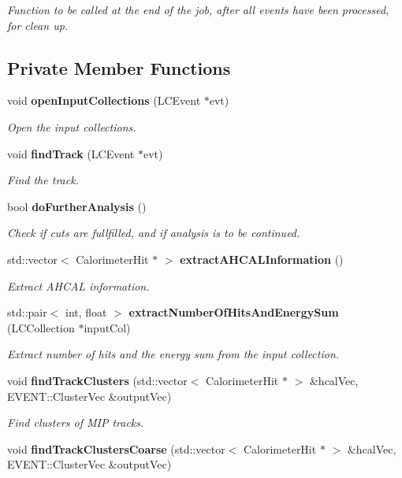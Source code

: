 \begin{DoxyCompactItemize}
\begin{DoxyCompactList}\small\item\em Function to be called at the end of the job, after all events have been processed, for clean up. \item\end{DoxyCompactList}\end{DoxyCompactItemize}
\subsection*{Private Member Functions}
\begin{DoxyCompactItemize}
\item 
void {\bf openInputCollections} (LCEvent $\ast$evt)
\begin{DoxyCompactList}\small\item\em Open the input collections. \item\end{DoxyCompactList}\item 
void {\bf findTrack} (LCEvent $\ast$evt)
\begin{DoxyCompactList}\small\item\em Find the track. \item\end{DoxyCompactList}\item 
bool {\bf doFurtherAnalysis} ()
\begin{DoxyCompactList}\small\item\em Check if cuts are fullfilled, and if analysis is to be continued. \item\end{DoxyCompactList}\item 
std::vector$<$ CalorimeterHit $\ast$ $>$ {\bf extractAHCALInformation} ()\label{classCALICE_1_1AngleTrackFinder_a86fc7e637d10c7ee1ab9851b1fc54e1b}

\begin{DoxyCompactList}\small\item\em Extract AHCAL information. \item\end{DoxyCompactList}\item 
std::pair$<$ int, float $>$ {\bf extractNumberOfHitsAndEnergySum} (LCCollection $\ast$inputCol)
\begin{DoxyCompactList}\small\item\em Extract number of hits and the energy sum from the input collection. \item\end{DoxyCompactList}\item 
void {\bf findTrackClusters} (std::vector$<$ CalorimeterHit $\ast$ $>$ \&hcalVec, EVENT::ClusterVec \&outputVec)
\begin{DoxyCompactList}\small\item\em Find clusters of MIP tracks. \item\end{DoxyCompactList}\item 
void {\bfseries findTrackClustersCoarse} (std::vector$<$ CalorimeterHit $\ast$ $>$ \&hcalVec, EVENT::ClusterVec \&outputVec)\label{classCALICE_1_1AngleTrackFinder_a2a052d786ad1c5defe012d580f9da5d1}


\end{DoxyCompactItemize}
